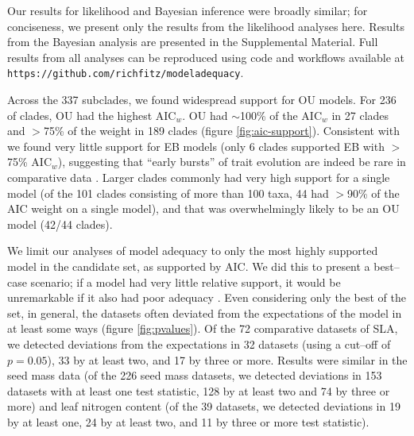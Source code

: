 \documentclass[a4paper,11pt]{article}
\begin{document}
Our results for likelihood and Bayesian inference were broadly similar; for conciseness, we present only the results from the likelihood analyses here. Results from the Bayesian analysis are presented in the Supplemental Material. Full results from all analyses can be reproduced using code and workflows available at \texttt{https://github.com/richfitz/modeladequacy}. 

Across the 337 subclades, we found widespread support for OU
models. For 236 of clades, OU had the highest AIC$_w$.
OU had $\sim$100\% of the AIC$_w$ in 27 clades and $>$75\% of the weight in 189 clades (figure \ref{fig:aic-support}). Consistent with \citet{Harmon2010} we found very little support for EB models (only 6 clades supported EB with $>$75\% AIC$_w$), suggesting that ``early bursts'' of trait evolution are indeed be rare in comparative data \citep[but see][]{SlaterPennell}. Larger clades commonly had
very high support for a single model (of the 101 clades consisting of more than 100 taxa, 44 had $>$90\% of the AIC weight on a single model),
and that was overwhelmingly likely to be an OU model (42/44 clades). 

We limit our analyses of model adequacy to only the most highly supported model in the candidate set, as supported by AIC. We did this to present a best--case scenario; if a model had very little relative support, it would be unremarkable if it also had poor adequacy \citep[but see][]{Ripplinger2010}. Even considering only the best of the set, in general, the datasets often deviated from the expectations of the model in at least some ways (figure \ref{fig:pvalues}). 
Of the 72 comparative datasets of SLA, we detected deviations from the expectations in 32 datasets (using a cut--off of $p= 0.05$), 33 by at least two, and 17 by three or more. 
Results were similar in the seed mass data (of the 226 seed mass datasets, we detected deviations in 153 datasets with at least one test statistic, 128 by at least two and 74 by three or more) and leaf nitrogen content 
(of the 39 datasets, we detected deviations in 19 by at least one, 24 by at least two, and 11 by three or more test statistic). 
\end{document}
